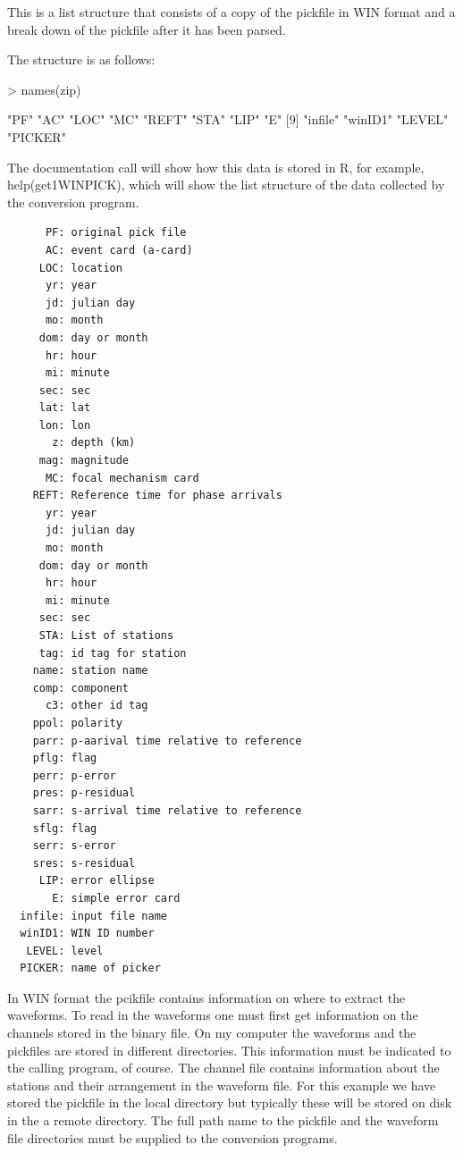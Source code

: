 \documentclass{article}
\begin{document}
This is a list structure that consists of a copy of the pickfile
in WIN format and a break down of the pickfile
after it has been parsed.

The structure is as follows:

\begin{Schunk}
\begin{Sinput}
> names(zip)
\end{Sinput}
\begin{Soutput}
 [1] "PF"     "AC"     "LOC"    "MC"     "REFT"   "STA"    "LIP"    "E"     
 [9] "infile" "winID1" "LEVEL"  "PICKER"
\end{Soutput}
\end{Schunk}

The documentation call will show how this data is
stored in R, for example, help(get1WINPICK),
which will show the list structure 
of the data collected by the conversion program.

\begin{verbatim}
      PF: original pick file
      AC: event card (a-card)
     LOC: location
      yr: year
      jd: julian day
      mo: month
     dom: day or month
      hr: hour
      mi: minute
     sec: sec
     lat: lat
     lon: lon
       z: depth (km)
     mag: magnitude
      MC: focal mechanism card
    REFT: Reference time for phase arrivals
      yr: year
      jd: julian day
      mo: month
     dom: day or month
      hr: hour
      mi: minute
     sec: sec
     STA: List of stations
     tag: id tag for station
    name: station name
    comp: component
      c3: other id tag
    ppol: polarity
    parr: p-aarival time relative to reference
    pflg: flag
    perr: p-error
    pres: p-residual
    sarr: s-arrival time relative to reference
    sflg: flag
    serr: s-error
    sres: s-residual
     LIP: error ellipse
       E: simple error card
  infile: input file name
  winID1: WIN ID number
   LEVEL: level
  PICKER: name of picker
\end{verbatim}

In WIN format the pcikfile contains information on where to 
extract the waveforms.  To read in the waveforms one must first 
get information on the channels stored in the 
binary file.  
On my computer the waveforms and the pickfiles are stored in 
different directories.  This information must be indicated
to the calling program, of course.
The channel file contains information about the stations
and their arrangement in the waveform file.
For this example we have stored the pickfile 
in the local directory
but typically these will be stored on disk
in the a remote directory.
The full path name to the 
pickfile and the waveform file directories
must be supplied to the 
conversion programs. 
\end{document}
